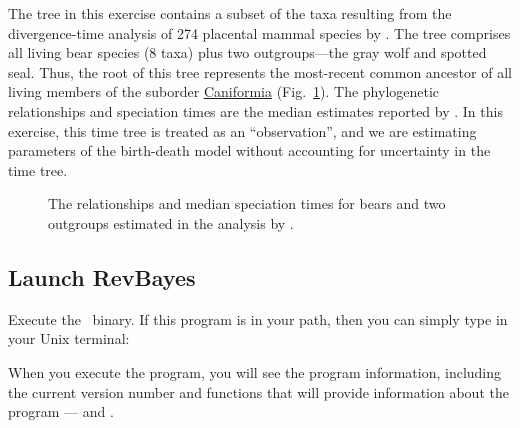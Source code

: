 The tree in this exercise contains a subset of the taxa resulting from the divergence-time analysis of 274 placental mammal species by \citet{dosReis2012}. 
The tree comprises all living bear species (8 taxa) plus two outgroups---the gray wolf and spotted seal.
Thus, the root of this tree represents the most-recent common ancestor of all living members of the suborder \href{http://en.wikipedia.org/wiki/Caniformia}{Caniformia} (Fig.~\ref{bearTree}). 
The phylogenetic relationships and speciation times are the median estimates reported by \citet{dosReis2012}. 
In this exercise, this time tree is treated as an ``observation'', and we are estimating parameters of the birth-death model without accounting for uncertainty in the time tree.


\begin{figure}[h!]
\centering
{}
\caption{\small The relationships and median speciation times for bears and two outgroups estimated in the analysis by \citet{dosReis2012}.}
\label{bearTree}
\end{figure}

\bigskip
\subsection{Launch RevBayes}

Execute the \RevBayes~binary. If this program is in your path, then you can simply type in your Unix terminal:


When you execute the program, you will see the program information, including the current version number and functions that will provide information about the program ---  and . %
%

